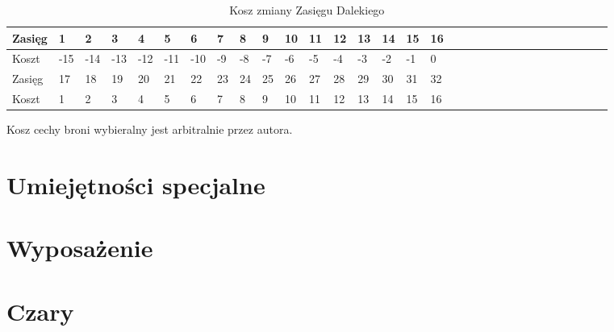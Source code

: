 \begin{table}[h]
\caption{Kosz zmiany Zasięgu Bliskiego}
\end{table}

\begin{table}[h]
\caption{Kosz zmiany Zasięgu Dalekiego}
    \begin{tabular}{|l|l|l|l|l|l|l|l|l|l|l|l|l|l|l|l|l|l|l|l|l|l|l|l|l|l|l|l|l|l|l|}
    \hline
    Zasięg & 1 & 2 & 3 & 4 & 5 & 6 & 7 & 8 & 9 & 10 & 11 & 12 & 13 & 14 & 15 & 16  \\ \hline
    Koszt & -15 & -14 & -13 & -12 & -11 & -10 & -9 & -8 & -7 & -6 & -5 & -4 & -3 & -2 & -1 & 0 \\ \hline
    Zasięg & 17 & 18 & 19 & 20 & 21 & 22 & 23 & 24 & 25 & 26 & 27 & 28 & 29 & 30 & 31 & 32 \\ \hline
    Koszt & 1 & 2 & 3 & 4 & 5 & 6 & 7 & 8 & 9 & 10 & 11 & 12 & 13 & 14 & 15 & 16 \\ \hline
    
    \end{tabular}
\end{table}



Kosz cechy broni wybieralny jest arbitralnie przez autora. 

\section{Umiejętności specjalne}

\section{Wyposażenie}

\section{Czary}